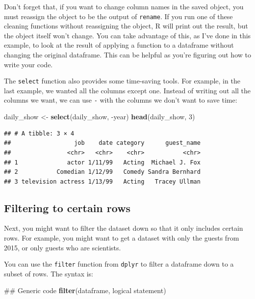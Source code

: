 \documentclass[]{book}
\makeatletter
\newenvironment{Shaded}{\begin{snugshade}}{\end{snugshade}}
\newcommand{\KeywordTok}[1]{\textcolor[rgb]{0.13,0.29,0.53}{\textbf{{#1}}}}
\newcommand{\DecValTok}[1]{\textcolor[rgb]{0.00,0.00,0.81}{{#1}}}
\newcommand{\StringTok}[1]{\textcolor[rgb]{0.31,0.60,0.02}{{#1}}}
\newcommand{\NormalTok}[1]{{#1}}
\newenvironment{kframe}{%
\medskip{}
\setlength{\fboxsep}{.8em}
 \def\at@end@of@kframe{}%
 \ifinner\ifhmode%
  \def\at@end@of@kframe{\end{minipage}}%
  \begin{minipage}{\columnwidth}%
 \fi\fi%
 \def\FrameCommand##1{\hskip\@totalleftmargin \hskip-\fboxsep
 \colorbox{shadecolor}{##1}\hskip-\fboxsep
     \hskip-\linewidth \hskip-\@totalleftmargin \hskip\columnwidth}%
 \MakeFramed {\advance\hsize-\width
   \@totalleftmargin\z@ \linewidth\hsize
   \@setminipage}}%
 {\par\unskip\endMakeFramed%
 \at@end@of@kframe}
\renewenvironment{Shaded}{\begin{kframe}}{\end{kframe}}
\newenvironment{rmdblock}[1]
  {
  \begin{itemize}
  \renewcommand{\labelitemi}{
    \raisebox{-.7\height}[0pt][0pt]{
      {\setkeys{Gin}{width=3em,keepaspectratio}\texttt{[image: images/\#1]}}
    }
  }
  \setlength{\fboxsep}{1em}
  \begin{kframe}
  \item
  }
  {
  \end{kframe}
  \end{itemize}
  }
\newenvironment{rmdwarning}
  {\begin{rmdblock}{warning}}
  {\end{rmdblock}}
\makeatother
\begin{document}
\begin{rmdwarning}
Don't forget that, if you want to change column names in the saved
object, you must reassign the object to be the output of
\texttt{rename}. If you run one of these cleaning functions without
reassigning the object, R will print out the result, but the object
itself won't change. You can take advantage of this, as I've done in
this example, to look at the result of applying a function to a
dataframe without changing the original dataframe. This can be helpful
as you're figuring out how to write your code.
\end{rmdwarning}

The \texttt{select} function also provides some time-saving tools. For
example, in the last example, we wanted all the columns except one.
Instead of writing out all the columns we want, we can use \texttt{-}
with the columns we don't want to save time:

\begin{Shaded}
\begin{Highlighting}[]
\NormalTok{daily_show <-}\StringTok{ }\KeywordTok{select}\NormalTok{(daily_show, -year)}
\KeywordTok{head}\NormalTok{(daily_show, }\DecValTok{3}\NormalTok{)}
\end{Highlighting}
\end{Shaded}

\begin{verbatim}
## # A tibble: 3 × 4
##                  job    date category      guest_name
##                <chr>   <chr>    <chr>           <chr>
## 1              actor 1/11/99   Acting  Michael J. Fox
## 2           Comedian 1/12/99   Comedy Sandra Bernhard
## 3 television actress 1/13/99   Acting   Tracey Ullman
\end{verbatim}

\subsection{Filtering to certain rows}\label{filtering-to-certain-rows}

Next, you might want to filter the dataset down so that it only includes
certain rows. For example, you might want to get a dataset with only the
guests from 2015, or only guests who are scientists.

You can use the \texttt{filter} function from \texttt{dplyr} to filter a
dataframe down to a subset of rows. The syntax is:

\begin{Shaded}
\begin{Highlighting}[]
\NormalTok{## Generic code}
\KeywordTok{filter}\NormalTok{(dataframe, logical statement)}
\end{Highlighting}
\end{Shaded}
\end{document}

